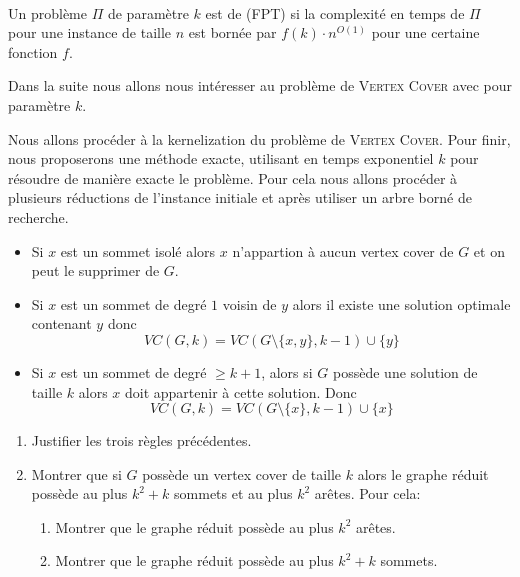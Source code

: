 \begin{td-exo}\, %
	\begin{definition}
		Un problème \(\Pi\) de paramètre \(k\) est de  (FPT) si la complexité en temps de \(\Pi\) pour une instance de taille \(n\) est bornée par \(f(k) \cdot n^{O(1)}\) pour une certaine fonction \(f\).
	\end{definition}

	Dans la suite nous allons nous intéresser au problème de \textsc{Vertex Cover} avec pour paramètre \(k\).

	Nous allons procéder à la kernelization du problème de \textsc{Vertex Cover}.
	Pour finir, nous proposerons une méthode exacte, utilisant en temps exponentiel \(k\) pour résoudre de manière exacte le problème.
	Pour cela nous allons procéder à plusieurs réductions de l'instance initiale et après utiliser un arbre borné de recherche.

	\begin{itemize}
		\item Si \(x\) est un sommet isolé alors \(x\) n'appartion à aucun vertex cover de \(G\) et on peut le supprimer de \(G\).
		\item Si \(x\) est un sommet de degré \(1\) voisin de \(y\) alors il existe une solution optimale contenant \(y\) donc
		\begin{equation*}
			VC(G, k) = VC(G \setminus \{x, y\}, k - 1) \cup \{y\}
		\end{equation*}
		\item Si \(x\) est un sommet de degré \(\geq k + 1\), alors si \(G\) possède une solution de taille \(k\) alors \(x\) doit appartenir à cette solution. Donc
		\begin{equation*}
			VC(G, k) = VC(G \setminus \{x\}, k - 1) \cup \{x\}
		\end{equation*}
	\end{itemize}

	\begin{enumerate}
		\item Justifier les trois règles précédentes.

		\item Montrer que si \(G\) possède un vertex cover de taille \(k\) alors le graphe réduit possède au plus \(k^2 + k\) sommets et au plus \(k^2\) arêtes. 
		Pour cela:
		\begin{enumerate}
			\item Montrer que le graphe réduit possède au plus \(k^2\) arêtes.
			\item Montrer que le graphe réduit possède au plus \(k^2 + k\) sommets.
		\end{enumerate}
		

\end{enumerate}
\end{td-exo}

